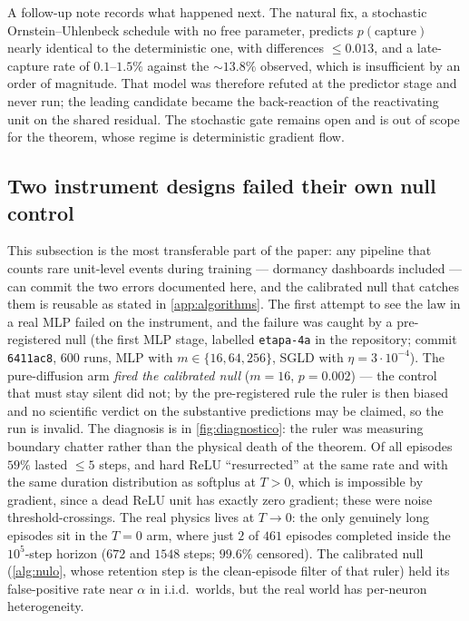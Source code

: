 \documentclass[11pt]{article}
\theoremstyle{definition}
\theoremstyle{remark}
\begin{document}
A follow-up note records what happened next. The natural fix, a stochastic
Ornstein--Uhlenbeck schedule with no free parameter, predicts $p(\mathrm{capture})$
nearly identical to the deterministic one, with differences $\le0.013$, and a
late-capture rate of $0.1$--$1.5\%$ against the $\sim13.8\%$ observed, which is
insufficient by an order of magnitude. That model was therefore refuted at the
predictor stage and never run; the leading candidate became the back-reaction of
the reactivating unit on the shared residual. The stochastic gate remains open
and is out of scope for the theorem, whose regime is deterministic gradient flow.

\subsection{Two instrument designs failed their own null control}\label{sec:negatives}

This subsection is the most transferable part of the paper: any pipeline that
counts rare unit-level events during training --- dormancy dashboards included
--- can commit the two errors documented here, and the calibrated null that
catches them is reusable as stated in \cref{app:algorithms}.
The first attempt to see the law in a real MLP failed on the instrument, and the
failure was caught by a pre-registered null (the first MLP stage, labelled
\texttt{etapa-4a} in the repository; commit \texttt{6411ac8}, 600 runs, MLP with
$m\in\{16,64,256\}$, SGLD with $\eta=3\cdot10^{-4}$). The
pure-diffusion arm \emph{fired the calibrated null} ($m=16$, $p=0.002$) ---
the control that must stay silent did not; by the
pre-registered rule the ruler is then biased and no scientific verdict on the
substantive predictions may be claimed, so the run is invalid. The diagnosis is
in \cref{fig:diagnostico}: the ruler was measuring boundary chatter rather than
the physical death of the theorem. Of all episodes $59\%$ lasted $\le5$ steps,
and hard ReLU ``resurrected'' at the same rate and with the same duration
distribution as softplus at $T>0$, which is impossible by gradient, since a dead
ReLU unit has exactly zero gradient; these were noise threshold-crossings. The
real physics lives at $T\to0$: the only genuinely long episodes sit in the $T=0$
arm, where just $2$ of $461$ episodes completed inside the $10^{5}$-step horizon
($672$ and $1548$ steps; $99.6\%$ censored). The calibrated null
(\cref{alg:nulo}, whose retention step is the
clean-episode filter of that ruler) held its false-positive rate near
$\alpha$ in i.i.d.\ worlds, but the real world has per-neuron heterogeneity.
\end{document}
